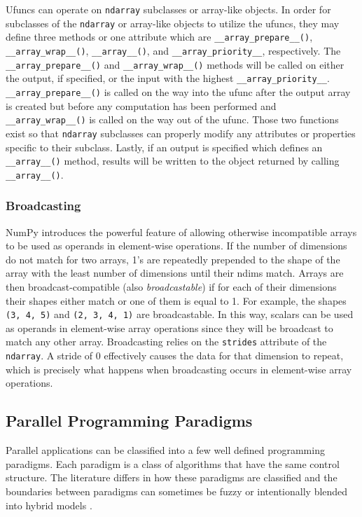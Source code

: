 \documentclass[preprint]{sigplanconf}
\begin{document}
Ufuncs can operate on \verb=ndarray= subclasses or array-like objects. In
order for subclasses of the \verb=ndarray= or array-like objects to utilize
the ufuncs, they may define three methods or one attribute which are
\verb=__array_prepare__()=, \verb=__array_wrap__()=, \verb=__array__()=, and
\verb=__array_priority__=, respectively.  The\linebreak
\verb=__array_prepare__()= and \verb=__array_wrap__()= methods will be called
on either the output, if specified, or the input with the highest
\verb=__array_priority__=.  \verb=__array_prepare__()= is called on the way
into the ufunc after the output array is created but before any computation
has been performed and \verb=__array_wrap__()= is called on the way out of the
ufunc. Those two functions exist so that \verb=ndarray= subclasses can
properly modify any attributes or properties specific to their subclass.
Lastly, if an output is specified which defines an \verb=__array__()= method,
results will be written to the object returned by calling \verb=__array__()=.

\subsubsection{Broadcasting}

NumPy introduces the powerful feature of allowing otherwise incompatible
arrays to be used as operands in element-wise operations. If the number of
dimensions do not match for two arrays, 1’s are repeatedly prepended to the
shape of the array with the least number of dimensions until their ndims
match. Arrays are then broadcast-compatible (also \emph{broadcastable}) if for
each of their dimensions their shapes either match or one of them is equal to
1.  For example, the shapes \verb=(3, 4, 5)= and \verb=(2, 3, 4, 1)= are
broadcastable. In this way, scalars can be used as operands in element-wise
array operations since they will be broadcast to match any other array.
Broadcasting relies on the \texttt{strides} attribute of the \texttt{ndarray}.
A stride of 0 effectively causes the data for that dimension to repeat, which
is precisely what happens when broadcasting occurs in element-wise array
operations.

\subsection{Parallel Programming Paradigms}

Parallel applications can be classified into a few well defined programming
paradigms. Each paradigm is a class of algorithms that have the same control
structure. The literature differs in how these paradigms are classified and
the boundaries between paradigms can sometimes be fuzzy or intentionally
blended into hybrid models \cite{Buy99}. 
\end{document}
